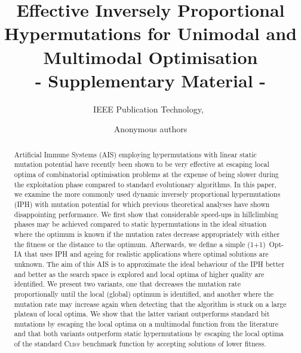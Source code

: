 \documentclass[lettersize,journal]{IEEEtran}
\begin{document}
\title{Effective Inversely Proportional Hypermutations for Unimodal and Multimodal Optimisation\\ - Supplementary Material -}

\author{IEEE Publication Technology,~	

}
\author{Anonymous authors	

}



\maketitle

\begin{abstract}

Artificial Immune Systems (AIS) employing hypermutations with linear static mutation potential have recently been shown to be very effective at escaping local optima of combinatorial optimisation problems at the expense of being slower during the exploitation phase compared to standard evolutionary algorithms.
In this paper, we examine the more commonly used dynamic inversely proportional  hypermutations (IPH) with mutation potential for which previous theoretical analyses have shown disappointing performance. We first show that considerable speed-ups
in hillclimbing phases may be achieved compared to static hypermutations in the ideal situation where the optimum is known if the mutation rates decrease appropriately with either the fitness or the distance to the optimum. Afterwards, we define a simple (1+1)~Opt-IA that uses IPH and ageing for realistic applications where optimal solutions are unknown. The aim of this AIS is to approximate the ideal behaviour of the IPH better and better as the search space is explored and local optima of higher quality are identified.
We present two variants, one that decreases the mutation rate proportionally until the local (global) optimum is identified, and another where the mutation rate may increase again when detecting that the algorithm is stuck on a large plateau of local optima.
We show that the latter variant outperforms standard bit mutations by escaping the local optima on a multimodal function from the literature and that both variants outperform static hypermutations by escaping the local optima of the standard \textsc{Cliff} benchmark function by accepting solutions of lower fitness.  
\end{abstract}
\end{document}

